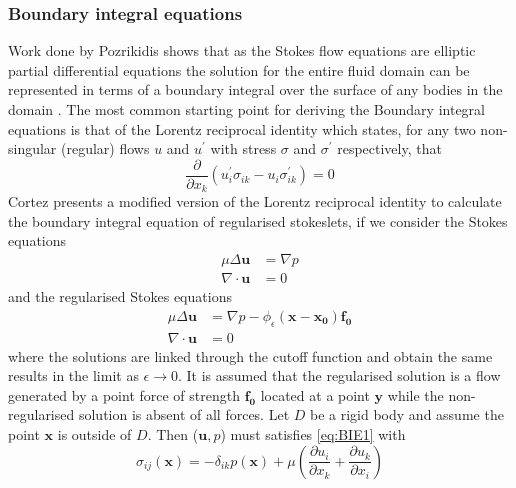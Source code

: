 \subsubsection{Boundary integral equations}
Work done by Pozrikidis \cite{Pozrikidis1992BoundaryFlow} shows that as the Stokes flow equations are elliptic partial differential equations the solution for the entire fluid domain can be represented in terms of a boundary integral over the surface of any bodies in the domain \cite{Stakgold1968Boundary2}. The most common starting point for deriving the Boundary integral equations is that of the Lorentz reciprocal identity which states, for any two non-singular (regular) flows $u$ and $u^\prime$ with stress $\sigma$ and $\sigma^\prime$ respectively, that
\begin{equation*}
    \frac{\partial}{\partial x_k}(u_i^\prime\sigma_{ik} - u_i \sigma^\prime_{ik}) = 0
\end{equation*}
Cortez presents a modified version of the Lorentz reciprocal identity to calculate the boundary integral equation of regularised stokeslets, if we consider the Stokes equations
\begin{equation}
    \label{eq:BIE1}
\begin{aligned}
      \mu\Delta\boldsymbol{u} &= \nabla p \\
      \nabla \cdot \boldsymbol{u} &= 0
\end{aligned}
\end{equation}
and the regularised Stokes equations
\begin{equation}
    \label{eq:BIE2}
\begin{aligned}
      \mu\Delta\boldsymbol{u} &= \nabla p - \phi_{\epsilon}(\bm{x}-\bm{x_0})\bm{f_0} \\
      \nabla \cdot \boldsymbol{u} &= 0
\end{aligned}
\end{equation}
where the solutions are linked through the cutoff function and obtain the same results in the limit as $\epsilon \to 0$. It is assumed that the regularised solution is a flow generated by a point force of strength $\bm{f_0}$ located at a point $\bm{y}$ while the non-regularised solution is absent of all forces. Let $D$ be a rigid body and assume the point $\bm{x}$ is outside of $D$. Then ($\bm{u},p$) must satisfies \cref{eq:BIE1} with
\begin{equation*}
\sigma_{ij}(\bm{x}) = -\delta_{ik}p(\bm{x}) + \mu\left( \frac{\partial u_i}{\partial x_k} + \frac{\partial u_k}{\partial x_i} \right)
\end{equation*}

